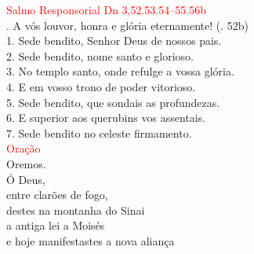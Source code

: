 \documentclass{book}
\begin{document}
\begin{flushleft}
    \textcolor{red}{Salmo Responsorial
        \hspace{\fill} Dn 3,52.53.54--55.56b}
    \vspace{.1cm} \\
    {\color{red} \Rbar.} A vós louvor, honra e glória eternamente!
    \hspace{\fill}
    {\color{red} (\Rbar. 52b)}
    \vspace{.1cm} \\
    1. Sede bendito, Senhor Deus de nossos pais.
    \vspace{.1cm} \\
    2. Sede bendito, nome santo e glorioso.
    \vspace{.1cm} \\
    3. No templo santo, onde refulge a vossa glória.
    \vspace{.1cm} \\
    4. E em vosso trono de poder vitorioso.
    \vspace{.1cm} \\
    5. Sede bendito, que sondais as profundezas.
    \vspace{.1cm} \\
    6. E superior aos querubins vos assentais.
    \vspace{.1cm} \\
    7. Sede bendito no celeste firmamento.
    \vspace{.2cm} \\
    \textcolor{red}{Oração}
    \vspace{.1cm} \\
    Oremos.
    \vspace{.1cm}\\
    Ó Deus, \\
    entre clarões de fogo, \\
    destes na montanha do Sinai \\
    a antiga lei a Moisés \\
    e hoje manifestastes a nova aliança \\

\end{flushleft}
\end{document}
